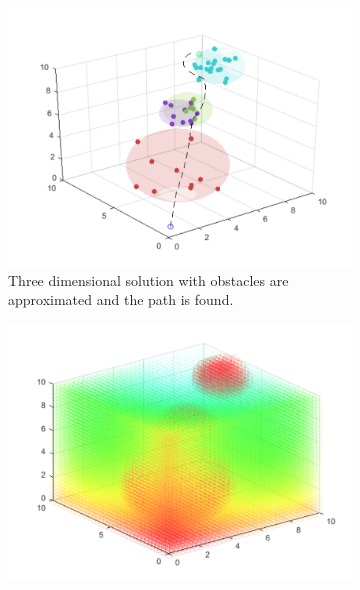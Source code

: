 \documentclass{IEEEtaes}
\begin{document}
{%


\begin{figure}
  \centering
  \begin{subfigure}{.5\columnwidth}
    \centering
    \includegraphics[width=\linewidth]{three-6.pdf}
    \caption{Three dimensional solution with obstacles are approximated and the path is found.}
  \end{subfigure}%
  \hfill
  \begin{subfigure}{.5\columnwidth}
    \centering
    \includegraphics[width=\linewidth]{three-pot-6.pdf}

\end{subfigure}
\end{figure}}
\end{document}

